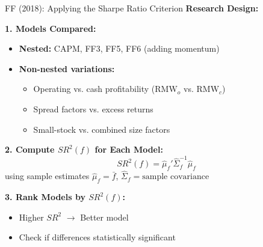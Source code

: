 \documentclass{beamer}
\begin{document}
\begin{frame}{FF (2018): Applying the Sharpe Ratio Criterion}
    \textbf{Research Design:}
    
    
    \textbf{1. Models Compared:}
    \begin{itemize}
        \item \textbf{Nested:} CAPM, FF3, FF5, FF6 (adding momentum)
        \item \textbf{Non-nested variations:}
        \begin{itemize}
            \item Operating vs. cash profitability ($\text{RMW}_o$ vs. $\text{RMW}_c$)
            \item Spread factors vs. excess returns
            \item Small-stock vs. combined size factors
        \end{itemize}
    \end{itemize}
    
    
    \textbf{2. Compute $SR^2(f)$ for Each Model:}
    \begin{equation*}
        SR^2(f) = \hat{\mu}_f' \hat{\Sigma}_f^{-1} \hat{\mu}_f
    \end{equation*}
    using sample estimates $\hat{\mu}_f = \bar{f}$, $\hat{\Sigma}_f = \text{sample covariance}$
    
    
    \textbf{3. Rank Models by $SR^2(f)$:}
    \begin{itemize}
        \item Higher $SR^2$ $\rightarrow$ Better model
        \item Check if differences statistically significant
    \end{itemize}
\end{frame}
\end{document}
